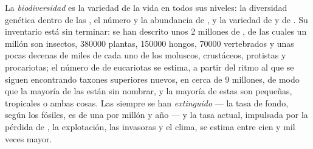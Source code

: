 \begin{definition}[Biodiversidad]\label{def:b1:classifying-biodiversity:biodiversity}
La \emph{biodiversidad} es la variedad de la vida en todos sus niveles: la
diversidad genética dentro de las , el número y la abundancia de
, y la variedad de  y de . Su inventario está
sin terminar: se han descrito unos \num{2} millones de , de las
cuales un millón son insectos, \num{380000} plantas, \num{150000} hongos,
\num{70000} vertebrados y unas pocas decenas de miles de cada uno de los
moluscos, crustáceos, protistas y procariotas; el número de  de
eucariotas se estima, a partir del ritmo al que se siguen encontrando
taxones superiores nuevos, en cerca de \num{9} millones, de modo que la
mayoría de las  están sin nombrar, y la mayoría de estas son
pequeñas, tropicales o ambas cosas. Las  siempre se han
\emph{extinguido} --- la tasa de fondo, según los fósiles, es de una 
por millón y año --- y la tasa actual, impulsada por la pérdida de ,
la explotación, las  invasoras y el clima, se estima entre cien y
mil veces mayor.
\end{definition}

